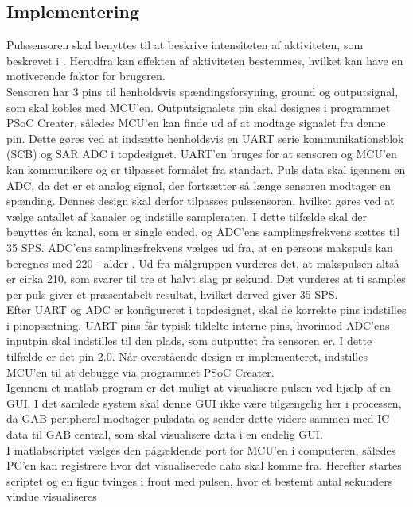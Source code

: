 \subsection{Implementering}
Pulssensoren skal benyttes til at beskrive intensiteten af aktiviteten, som beskrevet i . Herudfra kan effekten af aktiviteten bestemmes, hvilket kan have en motiverende faktor for brugeren. \\
Sensoren har 3 pins til henholdsvis spændingsforsyning, ground og outputsignal, som skal kobles med MCU'en. Outputsignalets pin skal designes i programmet PSoC Creater, således MCU'en kan finde ud af at modtage signalet fra denne pin. Dette gøres ved at indsætte henholdsvis en UART serie kommunikationsblok (SCB) og SAR ADC i topdesignet. UART'en bruges for at sensoren og MCU'en kan kommunikere og er tilpasset formålet fra standart. Puls data skal igennem en ADC, da det er et analog signal, der fortsætter så længe sensoren modtager en spænding. Dennes design skal derfor tilpasses pulssensoren, hvilket gøres ved at vælge antallet af kanaler og indstille sampleraten. I dette tilfælde skal der benyttes én kanal, som er single ended, og ADC'ens samplingsfrekvens sættes til 35 SPS. ADC'ens samplingsfrekvens vælges ud fra, at en persons makspuls kan beregnes med 220 - alder \citep{CooperBlair2005}. Ud fra målgruppen vurderes det, at makspulsen altså er cirka 210, som svarer til tre et halvt slag pr sekund. Det vurderes at ti samples per puls giver et præsentabelt resultat, hvilket derved giver 35 SPS.\\
Efter UART og ADC er konfigureret i topdesignet, skal de korrekte pins indstilles i pinopsætning. UART pins får typisk tildelte interne pins, hvorimod ADC'ens inputpin skal indstilles til den plads, som outputtet fra sensoren er. I dette tilfælde er det pin 2.0. Når overstående design er implementeret, indstilles MCU'en til at debugge via programmet PSoC Creater. \\

Igennem et matlab program er det muligt at visualisere pulsen ved hjælp af en GUI. I det samlede system skal denne GUI ikke være tilgængelig her i processen, da GAB peripheral modtager pulsdata og sender dette videre sammen med IC data til GAB central, som skal visualisere data i en endelig GUI.\\
I matlabscriptet vælges den pågældende port for MCU'en i computeren, således PC'en kan registrere hvor det visualiserede data skal komme fra. Herefter startes scriptet og en figur tvinges i front med pulsen, hvor et bestemt antal sekunders vindue visualiseres


